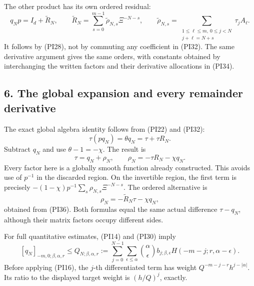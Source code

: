\documentclass[
  11pt,
]{article}
\makeatletter
\let\ReaderOriginalAnchorStart\hyper@anchorstart
\let\ReaderOriginalAnchorEnd\hyper@anchorend
\let\ReaderPendingAliases\@empty
\def\ReaderArmAliases#1{\gdef\ReaderPendingAliases{#1}}
\def\hyper@anchorstart#1{\ReaderIfNativeAnchorTF{#1}{\ReaderPendingAliases\global\let\ReaderPendingAliases\@empty}{}\ReaderOriginalAnchorStart{#1}}
\makeatother
\begin{document}
The other product has its own ordered residual: \[
 q_Np=I_d+\widetilde R_N,\qquad
 \widetilde R_N=\sum_{s=0}^{m-1}\widetilde\rho_{N,s}\Xi^{-N-s},
 \qquad
 \widetilde\rho_{N,s}
 =\sum_{\substack{1\leq\ell\leq m,\ 0\leq j<N\\j+\ell=N+s}}
 \tau_jA_\ell.
 \tag{PI36}
\] It follows by (PI28), not by commuting any coefficient in (PI32). The
same derivative argument gives the same orders, with constants obtained
by interchanging the written factors and their derivative allocations in
(PI34).

\ReaderArmAliases{\ReaderOriginalAnchorStart{AN03-PIN-006}\ReaderOriginalAnchorEnd\begingroup\expandafter\def\csname @currentHref\endcsname{AN03-PIN-006}\label{AN03-PIN-006}\endgroup\ReaderOriginalAnchorStart{an03-pin-006-the-global-expansion-and-every-remainder-derivative}\ReaderOriginalAnchorEnd\begingroup\expandafter\def\csname @currentHref\endcsname{an03-pin-006-the-global-expansion-and-every-remainder-derivative}\label{an03-pin-006-the-global-expansion-and-every-remainder-derivative}\endgroup\ReaderOriginalAnchorStart{6-the-global-expansion-and-every-remainder-derivative}\ReaderOriginalAnchorEnd\begingroup\expandafter\def\csname @currentHref\endcsname{6-the-global-expansion-and-every-remainder-derivative}\label{6-the-global-expansion-and-every-remainder-derivative}\endgroup}
\subsection{6. The global expansion and every remainder
derivative}\label{the-global-expansion-and-every-remainder-derivative}

The exact global algebra identity follows from (PI22) and (PI32): \[
 \tau(pq_N)=\theta q_N=\tau+\tau R_N.
\] Subtract \(q_N\) and use \(\theta-1=-\chi\). The result is \[
 \boxed{\quad
 \tau=q_N+\rho_N,\qquad
 \rho_N=-\tau R_N-\chi q_N.
 \quad}
 \tag{PI37}
\] Every factor here is a globally smooth function already constructed.
This avoids use of \(p^{-1}\) in the discarded region. On the invertible
region, the first term is precisely
\(-(1-\chi)p^{-1}\sum_s\rho_{N,s}\Xi^{-N-s}\). The ordered alternative
is \[
 \rho_N=-\widetilde R_N\tau-\chi q_N,
 \tag{PI38}
\] obtained from (PI36). Both formulas equal the same actual difference
\(\tau-q_N\), although their matrix factors occupy different sides.

For full quantitative estimates, (PI14) and (PI30) imply \[
 [q_N]_{-m,0;\beta,\alpha,r}\leq
 Q_{N;\beta,\alpha,r}
 :=\sum_{j=0}^{N-1}\sum_{\epsilon\leq\alpha}\binom\alpha\epsilon
 b_{j;\beta,\epsilon}H(-m-j;r,\alpha-\epsilon).
 \tag{PI39}
\] Before applying (PI16), the \(j\)-th differentiated term has weight
\(Q^{-m-j-r}h^{j-|\alpha|}\). Its ratio to the displayed target weight
is \((h/Q)^j\), exactly.
\end{document}
